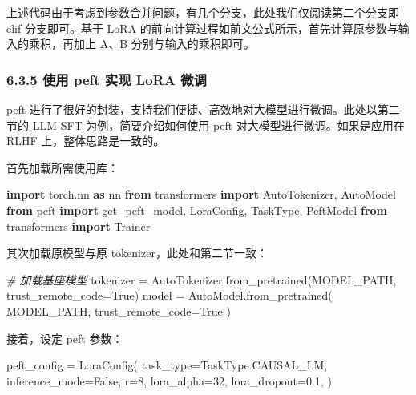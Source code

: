 \documentclass[
]{article}
\newenvironment{Shaded}{}{}
\newcommand{\CommentTok}[1]{\textcolor[rgb]{0.38,0.63,0.69}{\textit{#1}}}
\newcommand{\DecValTok}[1]{\textcolor[rgb]{0.25,0.63,0.44}{#1}}
\newcommand{\FloatTok}[1]{\textcolor[rgb]{0.25,0.63,0.44}{#1}}
\newcommand{\ImportTok}[1]{\textcolor[rgb]{0.00,0.50,0.00}{\textbf{#1}}}
\newcommand{\NormalTok}[1]{#1}
\newcommand{\OperatorTok}[1]{\textcolor[rgb]{0.40,0.40,0.40}{#1}}
\newcommand{\VariableTok}[1]{\textcolor[rgb]{0.10,0.09,0.49}{#1}}
\begin{document}
上述代码由于考虑到参数合并问题，有几个分支，此处我们仅阅读第二个分支即
elif 分支即可。基于 LoRA
的前向计算过程如前文公式所示，首先计算原参数与输入的乘积，再加上 A、B
分别与输入的乘积即可。

\subsubsection{6.3.5 使用 peft 实现 LoRA
微调}\label{ux4f7fux7528-peft-ux5b9eux73b0-lora-ux5faeux8c03}

peft
进行了很好的封装，支持我们便捷、高效地对大模型进行微调。此处以第二节的
LLM SFT 为例，简要介绍如何使用 peft 对大模型进行微调。如果是应用在 RLHF
上，整体思路是一致的。

首先加载所需使用库：

\begin{Shaded}
\begin{Highlighting}[]
\ImportTok{import}\NormalTok{ torch.nn }\ImportTok{as}\NormalTok{ nn}
\ImportTok{from}\NormalTok{ transformers }\ImportTok{import}\NormalTok{ AutoTokenizer, AutoModel}
\ImportTok{from}\NormalTok{ peft }\ImportTok{import}\NormalTok{ get\_peft\_model, LoraConfig, TaskType, PeftModel}
\ImportTok{from}\NormalTok{ transformers }\ImportTok{import}\NormalTok{ Trainer}
\end{Highlighting}
\end{Shaded}

其次加载原模型与原 tokenizer，此处和第二节一致：

\begin{Shaded}
\begin{Highlighting}[]
\CommentTok{\# 加载基座模型}
\NormalTok{tokenizer }\OperatorTok{=}\NormalTok{ AutoTokenizer.from\_pretrained(MODEL\_PATH, trust\_remote\_code}\OperatorTok{=}\VariableTok{True}\NormalTok{)}
\NormalTok{model }\OperatorTok{=}\NormalTok{ AutoModel.from\_pretrained(}
\NormalTok{    MODEL\_PATH, trust\_remote\_code}\OperatorTok{=}\VariableTok{True}
\NormalTok{)}
\end{Highlighting}
\end{Shaded}

接着，设定 peft 参数：

\begin{Shaded}
\begin{Highlighting}[]
\NormalTok{peft\_config }\OperatorTok{=}\NormalTok{ LoraConfig(}
\NormalTok{            task\_type}\OperatorTok{=}\NormalTok{TaskType.CAUSAL\_LM,}
\NormalTok{            inference\_mode}\OperatorTok{=}\VariableTok{False}\NormalTok{,}
\NormalTok{            r}\OperatorTok{=}\DecValTok{8}\NormalTok{,}
\NormalTok{            lora\_alpha}\OperatorTok{=}\DecValTok{32}\NormalTok{,}
\NormalTok{            lora\_dropout}\OperatorTok{=}\FloatTok{0.1}\NormalTok{,}
\NormalTok{        )}
\end{Highlighting}
\end{Shaded}
\end{document}
